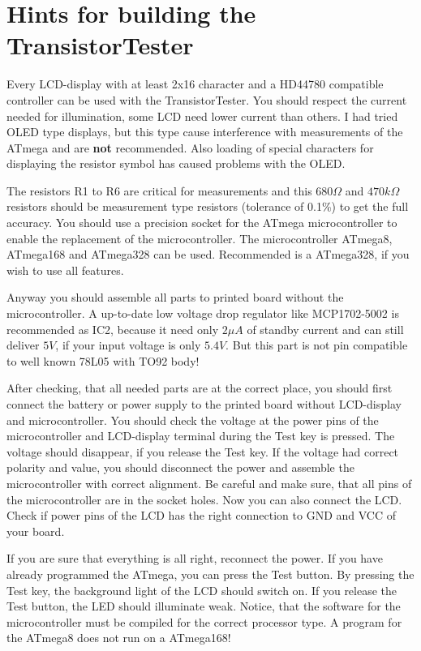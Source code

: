 \section{Hints for building the TransistorTester}
Every LCD-display with at least 2x16 character and a HD44780 compatible controller
can be used with the TransistorTester. You should respect the current needed for
illumination, some LCD need lower current than others.
I had tried OLED type displays, but this type cause interference with measurements
of the ATmega and are {\bf not} recommended. Also loading of special characters
for displaying the resistor symbol has caused problems with the OLED.

The resistors R1 to R6 are critical for measurements and this \(680\Omega\) and
\(470k\Omega\) resistors should be measurement type resistors (tolerance of 0.1\%) to
get the full accuracy.
You should use a precision socket for the ATmega microcontroller to enable
the replacement of the microcontroller.
The microcontroller ATmega8, ATmega168 and ATmega328 can be used.
Recommended is a ATmega328, if you wish to use all features.

Anyway you should assemble all parts to printed board without the microcontroller.
A up-to-date low voltage drop regulator like MCP1702-5002 is recommended as IC2, because it
need only \(2\mu A\) of standby current and can still deliver \(5V\), if your input
voltage is only \(5.4V\). But this part is not pin compatible to well known 78L05 with TO92 body!

After checking, that all needed parts are at the correct place, you should
first connect the battery or power supply to the printed board without LCD-display
and microcontroller. You should check the voltage at the power pins of the
microcontroller and LCD-display terminal during the Test key is pressed.
The voltage should disappear, if you release the Test key.
If the voltage had correct polarity and value,
you should disconnect the power and assemble the microcontroller with correct
alignment. Be careful and make sure, that all pins of the microcontroller
are in the socket holes.
Now you can also connect the LCD. Check if power pins of the LCD has the right connection to
GND and VCC of your board.

If you are sure that everything is all right, reconnect the power. 
If you have already programmed the ATmega, you can press the Test button.
By pressing the Test key, the background light of the LCD should switch on.
If you release the Test button, the LED should illuminate weak.
Notice, that the software for the microcontroller must be compiled for the
correct processor type. A program for the ATmega8 does not run on a ATmega168!


